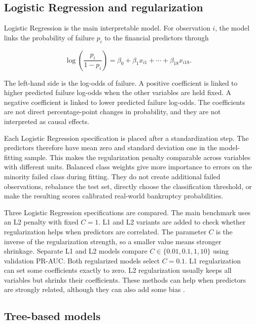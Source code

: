 \documentclass[11pt,a4paper]{article}
\begin{document}
\subsection{Logistic Regression and regularization}

Logistic Regression is the main interpretable model. For observation $i$, the
model links the probability of failure $p_i$ to the financial predictors through

\begin{equation}
  \log\left(\frac{p_i}{1-p_i}\right)
  = \beta_0 + \beta_1 x_{i1} + \cdots + \beta_{18} x_{i18}.
\end{equation}

The left-hand side is the log-odds of failure. A positive coefficient is linked
to higher predicted failure log-odds when the other variables are held fixed. A
negative coefficient is linked to lower predicted failure log-odds. The
coefficients are not direct percentage-point changes in probability, and they
are not interpreted as causal effects.

Each Logistic Regression specification is placed after a standardization step.
The predictors therefore have mean zero and standard deviation one in the
model-fitting sample. This makes the regularization penalty comparable across
variables with different units. Balanced class weights give more importance to
errors on the minority failed class during fitting. They do not create
additional failed observations, rebalance the test set, directly choose the
classification threshold, or make the resulting scores calibrated real-world
bankruptcy probabilities.

Three Logistic Regression specifications are compared. The main benchmark uses
an L2 penalty with fixed $C=1$. L1 and L2 variants are added to check whether
regularization helps when predictors are correlated. The parameter $C$ is the
inverse of the regularization strength, so a smaller value means stronger
shrinkage. Separate L1 and L2 models compare
$C \in \{0.01, 0.1, 1, 10\}$ using validation PR-AUC. Both regularized models
select $C=0.1$. L1 regularization can set some coefficients exactly to zero. L2
regularization usually keeps all variables but shrinks their coefficients. These
methods can help when predictors are strongly related, although they can also
add some bias \citep{james2023}.

\subsection{Tree-based models}
\end{document}
